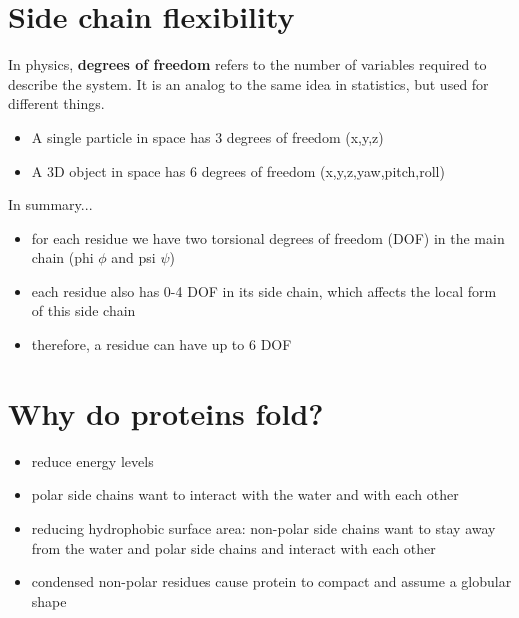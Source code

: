 \documentclass[10pt]{article}
\newenvironment{mitemize}
{
  \begin{itemize}
  \setlength{\itemsep}{1pt}
  \setlength{\parskip}{0pt}
  \setlength{\parsep}{0pt}}{\end{itemize}
}
\begin{document}
\section*{Side chain flexibility}
In physics, \textbf{degrees of freedom} refers to the number of variables required to describe the system. It is an analog to the same idea in statistics, but used for different things.

\begin{mitemize}
  \item A single particle in space has 3 degrees of freedom (x,y,z)
  \item A 3D object in space has 6 degrees of freedom (x,y,z,yaw,pitch,roll)
\end{mitemize}

In summary...
\begin{mitemize}
  \item for each residue we have two torsional degrees of freedom (DOF) in the main chain (phi $\phi$ and psi $\psi$)
  \item each residue also has 0-4 DOF in its side chain, which affects the local form of this side chain 
  \item therefore, a residue can have up to 6 DOF
\end{mitemize}

\section*{Why do proteins fold?}

\begin{mitemize}
  \item reduce energy levels
  \item polar side chains want to interact with the water and with each other
  \item reducing hydrophobic surface area: non-polar side chains want to stay away from the water and polar side chains and interact with each other
  \item condensed non-polar residues cause protein to compact and assume a globular shape
\end{mitemize}
\end{document}
